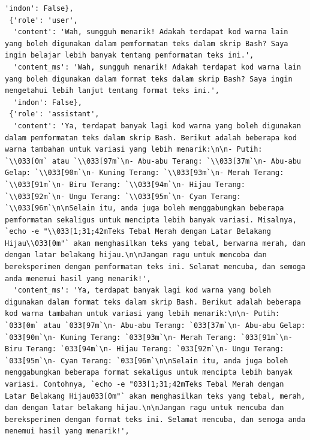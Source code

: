 \documentclass[preprint]{article}
\begin{document}
\begin{lstlisting}[breaklines=true]
  'indon': False},
 {'role': 'user',
  'content': 'Wah, sungguh menarik! Adakah terdapat kod warna lain yang boleh digunakan dalam pemformatan teks dalam skrip Bash? Saya ingin belajar lebih banyak tentang pemformatan teks ini.',
  'content_ms': 'Wah, sungguh menarik! Adakah terdapat kod warna lain yang boleh digunakan dalam format teks dalam skrip Bash? Saya ingin mengetahui lebih lanjut tentang format teks ini.',
  'indon': False},
 {'role': 'assistant',
  'content': 'Ya, terdapat banyak lagi kod warna yang boleh digunakan dalam pemformatan teks dalam skrip Bash. Berikut adalah beberapa kod warna tambahan untuk variasi yang lebih menarik:\n\n- Putih: `\\033[0m` atau `\\033[97m`\n- Abu-abu Terang: `\\033[37m`\n- Abu-abu Gelap: `\\033[90m`\n- Kuning Terang: `\\033[93m`\n- Merah Terang: `\\033[91m`\n- Biru Terang: `\\033[94m`\n- Hijau Terang: `\\033[92m`\n- Ungu Terang: `\\033[95m`\n- Cyan Terang: `\\033[96m`\n\nSelain itu, anda juga boleh menggabungkan beberapa pemformatan sekaligus untuk mencipta lebih banyak variasi. Misalnya, `echo -e "\\033[1;31;42mTeks Tebal Merah dengan Latar Belakang Hijau\\033[0m"` akan menghasilkan teks yang tebal, berwarna merah, dan dengan latar belakang hijau.\n\nJangan ragu untuk mencoba dan bereksperimen dengan pemformatan teks ini. Selamat mencuba, dan semoga anda menemui hasil yang menarik!',
  'content_ms': 'Ya, terdapat banyak lagi kod warna yang boleh digunakan dalam format teks dalam skrip Bash. Berikut adalah beberapa kod warna tambahan untuk variasi yang lebih menarik:\n\n- Putih: `033[0m` atau `033[97m`\n- Abu-abu Terang: `033[37m`\n- Abu-abu Gelap: `033[90m`\n- Kuning Terang: `033[93m`\n- Merah Terang: `033[91m`\n- Biru Terang: `033[94m`\n- Hijau Terang: `033[92m`\n- Ungu Terang: `033[95m`\n- Cyan Terang: `033[96m`\n\nSelain itu, anda juga boleh menggabungkan beberapa format sekaligus untuk mencipta lebih banyak variasi. Contohnya, `echo -e "033[1;31;42mTeks Tebal Merah dengan Latar Belakang Hijau033[0m"` akan menghasilkan teks yang tebal, merah, dan dengan latar belakang hijau.\n\nJangan ragu untuk mencuba dan bereksperimen dengan format teks ini. Selamat mencuba, dan semoga anda menemui hasil yang menarik!',

\end{lstlisting}
\end{document}
